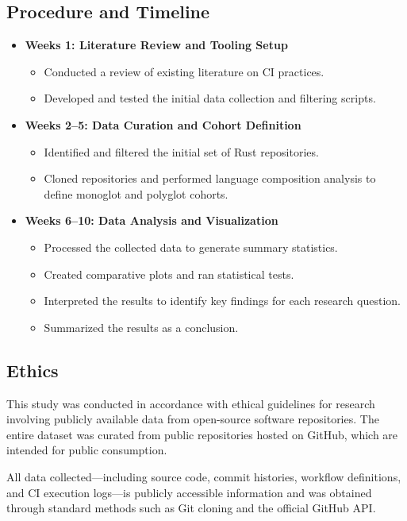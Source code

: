 \documentclass[11pt]{article}
\begin{document}
\subsection{Procedure and Timeline}
\begin{itemize}
\item \textbf{Weeks 1: Literature Review and Tooling Setup}
\begin{itemize}
\item Conducted a review of existing literature on CI practices.
\item Developed and tested the initial data collection and filtering scripts.
\end{itemize}

\item \textbf{Weeks 2–5: Data Curation and Cohort Definition}
\begin{itemize}
\item Identified and filtered the initial set of Rust repositories.
\item Cloned repositories and performed language composition analysis to define monoglot and polyglot cohorts.
\end{itemize}

\item \textbf{Weeks 6–10: Data Analysis and Visualization}
\begin{itemize}
\item Processed the collected data to generate summary statistics.
\item Created comparative plots and ran statistical tests.
\item Interpreted the results to identify key findings for each research question.
\item Summarized the results as a conclusion.
\end{itemize}
\end{itemize}

\subsection{Ethics}
This study was conducted in accordance with ethical guidelines for research involving publicly available data from open-source software repositories. The entire dataset was curated from public repositories hosted on GitHub, which are intended for public consumption.

All data collected—including source code, commit histories, workflow definitions, and CI execution logs—is publicly accessible information and was obtained through standard methods such as Git cloning and the official GitHub API.
\end{document}
